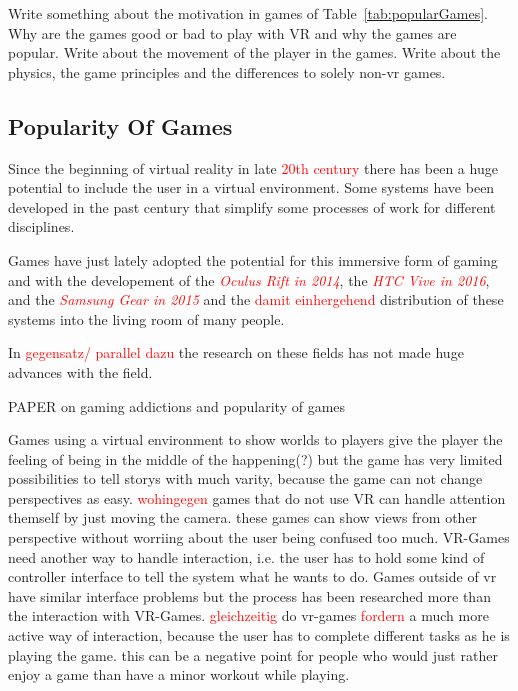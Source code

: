 Write something about the motivation in games of Table~\ref{tab:popularGames}. Why are the games good or bad to play with VR and why the games are popular. Write about the movement of the player in the games. Write about the physics, the game principles and the differences to solely non-vr games.

\subsection{Popularity Of Games}
Since the beginning of virtual reality in late \textcolor{red}{20th century} there has been a huge potential to include the user in a virtual environment. Some systems have been developed in the past century that simplify some processes of work for different disciplines. 

Games have just lately adopted the potential for this immersive form of gaming and with the developement of the \textcolor{red}{\textit{Oculus Rift in 2014}}, the \textcolor{red}{\textit{HTC Vive in 2016}}, and the \textcolor{red}{\textit{Samsung Gear in 2015}} and the \textcolor{red}{damit einhergehend} distribution of these systems into the living room of many people.

In \textcolor{red}{gegensatz/ parallel dazu} the research on these fields has not made huge advances with the field.

PAPER on gaming addictions and popularity of games

Games using a virtual environment to show worlds to players give the player the feeling of being in the middle of the happening(?) but the game has very limited possibilities to tell storys with much varity, because the game can not change perspectives as easy. \textcolor{red}{wohingegen} games that do not use VR can handle attention themself by just moving the camera. these games can show views from other perspective without worriing about the user being confused too much. VR-Games need another way to handle interaction, i.e. the user has to hold some kind of controller interface to tell the system what he wants to do. Games outside of vr have similar interface problems but the process has been researched more than the interaction with VR-Games. \textcolor{red}{gleichzeitig} do vr-games \textcolor{red}{fordern} a much more active way of interaction, because the user has to complete different tasks as he is playing the game. this can be a negative point for people who would just rather enjoy a game than have a minor workout while playing.
			
